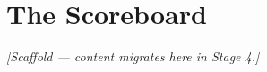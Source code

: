 \chapter{The Scoreboard}
\label{chap:scoreboard}


\noindent\emph{[Scaffold --- content migrates here in Stage 4.]}
